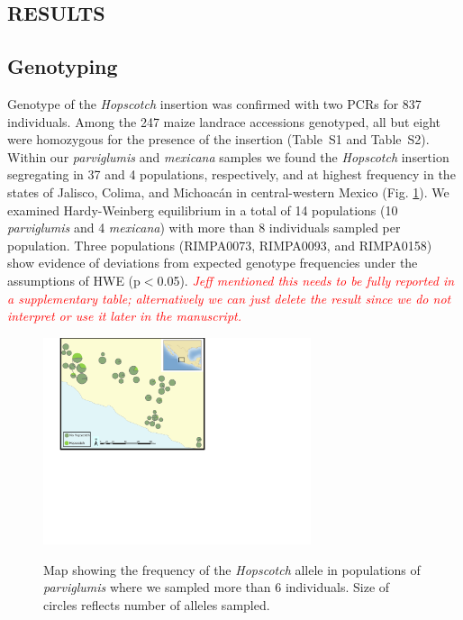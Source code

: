 \documentclass[11pt]{article}
\newcommand{\mbh}[1]{\textcolor{red}{ \emph{\scriptsize  #1}} }
\begin{document}
\begin{linenumbers}
\begin{flushleft}
\begin{centering}
\section*{RESULTS}
\end{centering}

\subsection*{Genotyping}

Genotype of the \emph{Hopscotch} insertion was confirmed with two PCRs for 837 individuals. Among the 247 maize landrace accessions genotyped, all but eight were homozygous for the presence of the insertion (Table~S1 and Table~S2). Within our \emph{parviglumis} and \emph{mexicana} samples we found the \emph{Hopscotch} insertion segregating in 37 and 4 populations, respectively, and at highest frequency in the states of Jalisco, Colima, and Michoac\'{a}n in central-western Mexico (Fig. \ref{Fig1Map}). We examined Hardy-Weinberg equilibrium in a total of 14 populations (10 \emph{parviglumis} and 4 \emph{mexicana}) with more than 8 individuals sampled per population. Three populations (RIMPA0073, RIMPA0093, and RIMPA0158) show evidence of deviations from expected genotype frequencies under the assumptions of HWE (p$<$0.05). \mbh{Jeff mentioned this needs to be fully reported in a supplementary table; alternatively we can just delete the result since we do not interpret or use it later in the manuscript.}
\begin{figure}
  \centering \label{Fig1Map}
   \includegraphics[width=0.7\textwidth]{Fig1Map.pdf}
    \caption{Map showing the frequency of the \emph{Hopscotch} allele in populations of \emph{parviglumis} where we sampled more than 6 individuals. Size of circles reflects number of alleles sampled. } 
\end{figure}


\end{flushleft}
\end{linenumbers}
\end{document}
